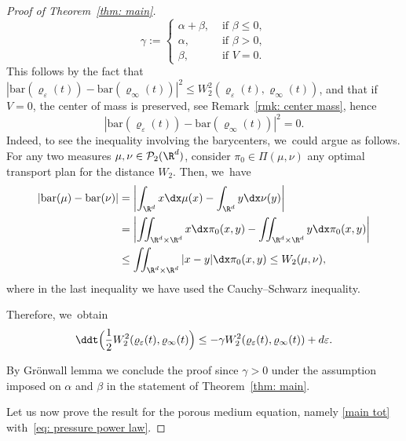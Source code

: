 \begin{proof}[Proof of Theorem~\ref{thm: main}]
\begin{equation*}
\gamma := \begin{cases}
\alpha+ \beta, &\text{ if } \beta\leq 0,\\
\alpha, &\text{ if } \beta>0,\\
\beta, &\text{ if } V=0.
\end{cases}
\end{equation*}
This follows by the fact that $|\mathrm{bar}(\varrho_\varepsilon(t))- \mathrm{bar}(\varrho_\infty(t))|^2\leq W^2_2(\varrho_\varepsilon(t),\varrho_\infty(t))$, and that if $V=0$, the center of mass is preserved, see Remark~\ref{rmk: center mass}, hence\vspace*{-3pt}
\[
|\mathrm{bar}(\varrho_\varepsilon(t))- \mathrm{bar}(\varrho_\infty(t))|^2=0.
\]
Indeed, to see the inequality involving the barycenters, we~could argue as follows. For any two measures $\mu,\nu \in \mathcal{P}_{2}(\R^{d})$, consider $\pi_{0}\in\Pi(\mu,\nu)$ any optimal transport plan for the distance $W_{2}$. Then, we~have\vspace*{-3pt}
\begin{align*}
\left| \mathrm{bar}(\mu) - \mathrm{bar}(\nu)\right| & = \left| \int_{\R^{d}}x\dx\mu(x) - \int_{\R^{d}} y \dx \nu(y)\right| \\
&= \left| \iint_{\R^{d}\times\R^{d}}x\dx\pi_{0}(x,y) - \iint_{\R^{d}\times\R^{d}} y \dx \pi_{0}(x,y)\right|\\
&\le \iint_{\R^{d}\times\R^{d}}|x-y|\dx\pi_{0}(x,y) \le W_{2}(\mu,\nu),
\end{align*}
where in the last inequality we have used the Cauchy--Schwarz inequality.

Therefore, we~obtain\vspace*{-3pt}
\begin{equation*}
\ddt \Bigl(\frac 12 W_2^2(\varrho_\varepsilon(t),\varrho_\infty(t)\Bigr)\leq -\gamma W_2^2(\varrho_\varepsilon(t),\varrho_\infty(t)) + d \varepsilon.
\end{equation*}

By Grönwall lemma we conclude the proof since $\gamma>0$ under the assumption imposed on $\alpha$ and $\beta$ in the statement of Theorem~\ref{thm: main}.

Let us now prove the result for the porous medium equation, namely \eqref{main tot} with~\eqref{eq: pressure power law}.


\end{proof}
